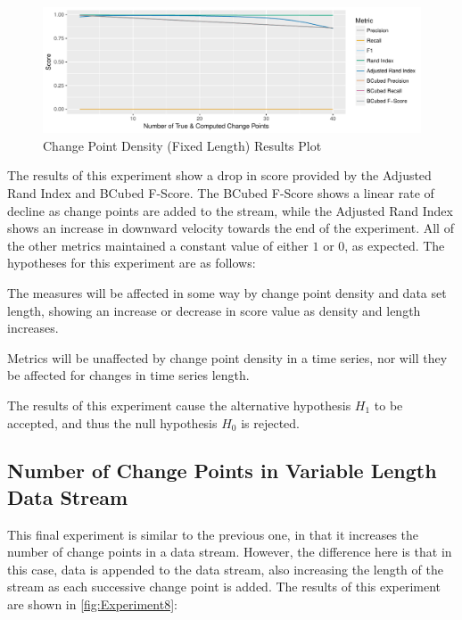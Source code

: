\documentclass[../main.tex]{subfiles}
\begin{document}
\begin{figure}[h]
    \includegraphics[width=\textwidth]{figures/Experiment8}
    \caption{Change Point Density (Fixed Length) Results Plot}
    \label{fig:Experiment7}
\end{figure}

The results of this experiment show a drop in score provided by the Adjusted Rand Index and BCubed F-Score. The BCubed F-Score shows a linear rate of decline as change points are added to the stream, while the Adjusted Rand Index shows an increase in downward velocity towards the end of the experiment. All of the other metrics maintained a constant value of either $1$ or $0$, as expected. The hypotheses for this experiment are as follows:

\begin{hypothesis*}
    The measures will be affected in some way by change point density and data set length, showing an increase or decrease in score value as density and length increases.
\end{hypothesis*}

\begin{nullhypothesis*}
    Metrics will be unaffected by change point density in a time series, nor will they be affected for changes in time series length.
\end{nullhypothesis*}

The results of this experiment cause the alternative hypothesis $H_1$ to be accepted, and thus the null hypothesis $H_0$ is rejected.

\subsection{Number of Change Points in Variable Length Data Stream}

This final experiment is similar to the previous one, in that it increases the number of change points in a data stream. However, the difference here is that in this case, data is appended to the data stream, also increasing the length of the stream as each successive change point is added. The results of this experiment are shown in \autoref{fig:Experiment8}:
\end{document}
